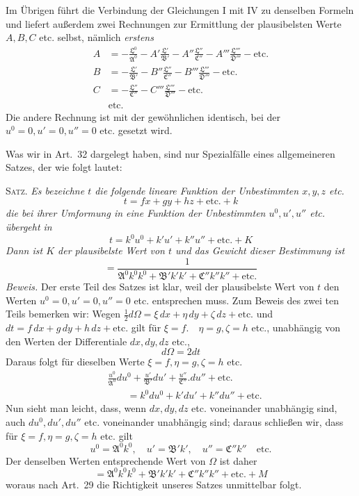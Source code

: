 Im Übrigen führt die Verbindung der Gleichungen I mit IV zu denselben Formeln und liefert außerdem zwei Rechnungen zur Ermittlung der plausibelsten Werte \(A,B,C\) etc. selbst, nämlich \textit{erstens}
\[
\begin{aligned}
A&=-\frac{\mathfrak{L}^0}{\mathfrak{A}^0}-A'\frac{\mathfrak{L}'}{\mathfrak{B}'}-A''\frac{\mathfrak{L}''}{\mathfrak{C}''}-A'''\frac{\mathfrak{L}'''}{\mathfrak{D}'''}-\text{etc.}\\[4pt]
B&=-\frac{\mathfrak{L}'}{\mathfrak{B}'}-B''\frac{\mathfrak{L}''}{\mathfrak{C}''}-B'''\frac{\mathfrak{L}'''}{\mathfrak{D}'''}-\text{etc.}\\[4pt]
C&=-\frac{\mathfrak{L}''}{\mathfrak{C}''}-C'''\frac{\mathfrak{L}'''}{\mathfrak{D}'''}-\text{etc.}\\
&\text{etc.}
\end{aligned}
\]
Die andere Rechnung ist mit der gewöhnlichen identisch, bei der \(u^0=0,\allowbreak u'=0,\allowbreak u''=0\) etc. gesetzt wird.

Was wir in Art.\ 32 dargelegt haben, sind nur Spezialfälle eines allgemeineren Satzes, der wie folgt lautet:

\textsc{Satz.} \textit{Es bezeichne \(t\) die folgende lineare Funktion der Unbestimmten \(x,y,z\) etc.}
\[
t=fx+gy+hz+\text{etc.}+k
\]
\textit{die bei ihrer Umformung in eine Funktion der Unbestimmten \(u^0,u',u''\) etc. übergeht in}
\[
t=k^0u^0+k'u'+k''u''+\text{etc.}+K
\]
\textit{Dann ist \(K\) der plausibelste Wert von \(t\) und das Gewicht dieser Bestimmung ist}
\[
=\frac1{\mathfrak{A}^0k^0k^0+\mathfrak{B}'k'k'+\mathfrak{C}''k''k''+\text{etc.}}
\]
\textit{Beweis.} Der erste Teil des Satzes ist klar, weil der plausibelste Wert von \(t\) den Werten \(u^0=0,\allowbreak u'=0,\allowbreak u''=0\) etc. entsprechen muss. Zum Beweis des zwei%
ten Teils bemerken wir: Wegen \(\tfrac12d\Omega=\xi\,dx+\eta\,dy+\zeta\,dz+\text{etc.}\) und \(dt=f\,dx+g\,dy+h\,dz+\text{etc.}\) gilt für \(\xi=f.\quad\eta=g,\allowbreak\zeta=h\) etc., unabhängig von den Werten der Differentiale \(dx,dy,dz\) etc.,
\[
d\Omega=2dt
\]
Daraus folgt für dieselben Werte \(\xi=f,\allowbreak\eta=g,\allowbreak\zeta=h\) etc.
\[
\begin{aligned}
&\frac{u^0}{\mathfrak{A}^0}du^0+\frac{u'}{\mathfrak{B}'}du'+\frac{u''}{\mathfrak{C}''}.du''+\text{etc.}\\
&\qquad=k^0du^0+k'du'+k''du''+\text{etc.}
\end{aligned}
\]
Nun sieht man leicht, dass, wenn \(dx,dy,dz\) etc. voneinander unabhängig sind, auch \(du^0,du',du''\) etc. voneinander unabhängig sind; daraus schließen wir, dass für \(\xi=f,\allowbreak\eta=g,\allowbreak\zeta=h\) etc. gilt
\[
u^0=\mathfrak{A}^0k^0,\quad u'=\mathfrak{B}'k',\quad u''=\mathfrak{C}''k''\quad\text{etc.}
\]
Der denselben Werten entsprechende Wert von \(\Omega\) ist daher
\[
=\mathfrak{A}^0k^0k^0+\mathfrak{B}'k'k'+\mathfrak{C}''k''k''+\text{etc.}+M
\]
woraus nach Art.\ 29 die Richtigkeit unseres Satzes unmittelbar folgt.

